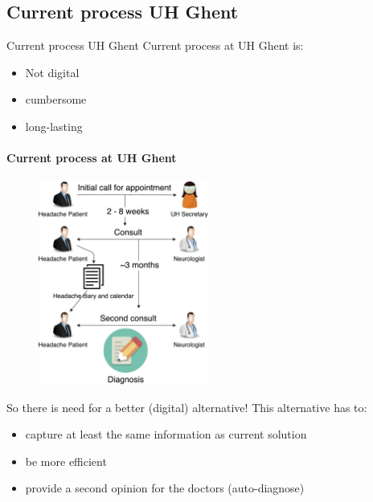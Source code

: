 \documentclass[english]{beamer}
\begin{document}
\subsection{Current process UH Ghent}
\begin{frame}{Current process UH Ghent}
	Current process at UH Ghent is:
	\begin{itemize}
		\item Not digital
		\item cumbersome
		\item long-lasting
	\end{itemize}
\end{frame}
\begin{frame}
	\framesubtitle{Current process at UH Ghent}
	\begin{figure}[!h]
		\includegraphics[width=0.5\textwidth]{figures/UZ_patient.pdf}
	\end{figure}
\end{frame}
\begin{frame}
	So there is need for a better (digital) alternative! This alternative has to:
	\begin{itemize}
		\item capture at least the same information as current solution
		\item be more efficient
		\item provide a second opinion for the doctors (auto-diagnose)
	\end{itemize}
\end{frame}
\end{document}
